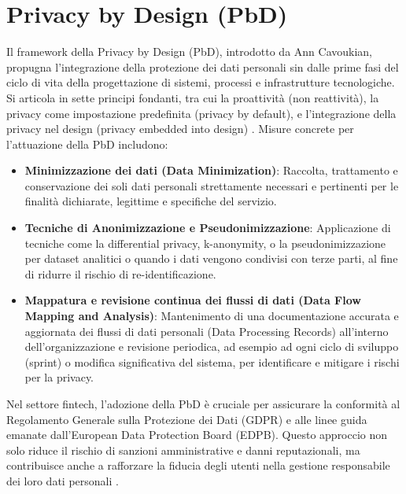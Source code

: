\section{Privacy by Design (PbD)}
Il framework della Privacy by Design (PbD), introdotto da Ann Cavoukian, propugna l'integrazione della protezione dei dati personali sin dalle prime fasi del ciclo di vita della progettazione di sistemi, processi e infrastrutture tecnologiche. Si articola in sette principi fondanti, tra cui la proattività (non reattività), la privacy come impostazione predefinita (privacy by default), e l'integrazione della privacy nel design (privacy embedded into design) \cite{Cavoukian_PbD_2009}.
Misure concrete per l'attuazione della PbD includono:
\begin{itemize}
\item \textbf{Minimizzazione dei dati (Data Minimization)}: Raccolta, trattamento e conservazione dei soli dati personali strettamente necessari e pertinenti per le finalità dichiarate, legittime e specifiche del servizio.
\item \textbf{Tecniche di Anonimizzazione e Pseudonimizzazione}: Applicazione di tecniche come la differential privacy, k-anonymity, o la pseudonimizzazione per dataset analitici o quando i dati vengono condivisi con terze parti, al fine di ridurre il rischio di re-identificazione.
\item \textbf{Mappatura e revisione continua dei flussi di dati (Data Flow Mapping and Analysis)}: Mantenimento di una documentazione accurata e aggiornata dei flussi di dati personali (Data Processing Records) all'interno dell'organizzazione e revisione periodica, ad esempio ad ogni ciclo di sviluppo (sprint) o modifica significativa del sistema, per identificare e mitigare i rischi per la privacy.
\end{itemize}
Nel settore fintech, l'adozione della PbD è cruciale per assicurare la conformità al Regolamento Generale sulla Protezione dei Dati (GDPR) e alle linee guida emanate dall'European Data Protection Board (EDPB). Questo approccio non solo riduce il rischio di sanzioni amministrative e danni reputazionali, ma contribuisce anche a rafforzare la fiducia degli utenti nella gestione responsabile dei loro dati personali \cite{Cavoukian_PbD_2009}.
